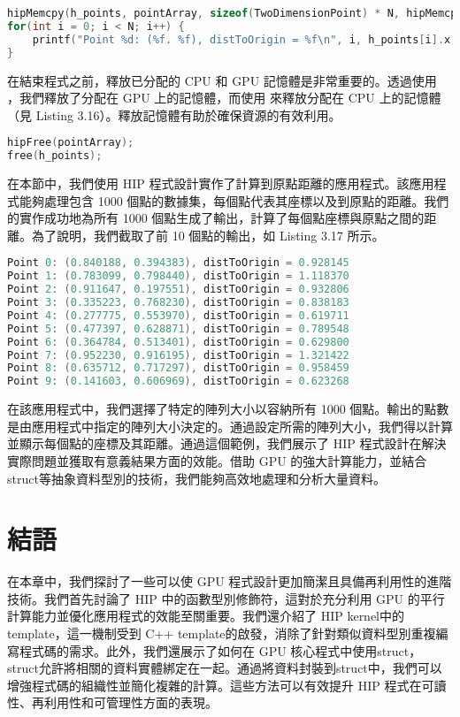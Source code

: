 \begin{lstlisting}[language=C, caption={從GPU到CPU的記憶體複製}, label={15th:example}]
hipMemcpy(h_points, pointArray, sizeof(TwoDimensionPoint) * N, hipMemcpyDeviceToHost);
for(int i = 0; i < N; i++) {
    printf("Point %d: (%f. %f), distToOrigin = %f\n", i, h_points[i].x, h_points[i.y, h_points[i].distToOrigin]);
}
\end{lstlisting}

在結束程式之前，釋放已分配的 CPU 和 GPU 記憶體是非常重要的。透過使用 ，我們釋放了分配在 GPU 上的記憶體，而使用  來釋放分配在 CPU 上的記憶體（見 Listing 3.16）。釋放記憶體有助於確保資源的有效利用。

\begin{lstlisting}[language=C, caption={HIP中的記憶體釋放}, label={16th:example}]
hipFree(pointArray);
free(h_points);
\end{lstlisting}

在本節中，我們使用 HIP 程式設計實作了計算到原點距離的應用程式。該應用程式能夠處理包含 1000 個點的數據集，每個點代表其座標以及到原點的距離。我們的實作成功地為所有 1000 個點生成了輸出，計算了每個點座標與原點之間的距離。為了說明，我們截取了前 10 個點的輸出，如 Listing 3.17 所示。

\begin{lstlisting}[language=C, caption={"Distance to Origin program" HIP 範例的輸出}, label={17th:example}]
Point 0: (0.840188, 0.394383), distToOrigin = 0.928145
Point 1: (0.783099, 0.798440), distToOrigin = 1.118370
Point 2: (0.911647, 0.197551), distToOrigin = 0.932806
Point 3: (0.335223, 0.768230), distToOrigin = 0.838183
Point 4: (0.277775, 0.553970), distToOrigin = 0.619711
Point 5: (0.477397, 0.628871), distToOrigin = 0.789548
Point 6: (0.364784, 0.513401), distToOrigin = 0.629800
Point 7: (0.952230, 0.916195), distToOrigin = 1.321422
Point 8: (0.635712, 0.717297), distToOrigin = 0.958459
Point 9: (0.141603, 0.606969), distToOrigin = 0.623268
\end{lstlisting}

在該應用程式中，我們選擇了特定的陣列大小以容納所有 1000 個點。輸出的點數是由應用程式中指定的陣列大小決定的。通過設定所需的陣列大小，我們得以計算並顯示每個點的座標及其距離。通過這個範例，我們展示了 HIP 程式設計在解決實際問題並獲取有意義結果方面的效能。借助 GPU 的強大計算能力，並結合struct等抽象資料型別的技術，我們能夠高效地處理和分析大量資料。

\section{結語}

在本章中，我們探討了一些可以使 GPU 程式設計更加簡潔且具備再利用性的進階技術。我們首先討論了 HIP 中的函數型別修飾符，這對於充分利用 GPU 的平行計算能力並優化應用程式的效能至關重要。我們還介紹了 HIP kernel中的template，這一機制受到 C++ template的啟發，消除了針對類似資料型別重複編寫程式碼的需求。此外，我們還展示了如何在 GPU 核心程式中使用struct，struct允許將相關的資料實體綁定在一起。通過將資料封裝到struct中，我們可以增強程式碼的組織性並簡化複雜的計算。這些方法可以有效提升 HIP 程式在可讀性、再利用性和可管理性方面的表現。

